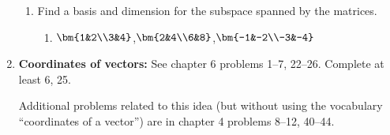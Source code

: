 \begin{enumerate}
\begin{enumerate}

	\item Find a basis and dimension for the subspace spanned by the matrices.
		\begin{enumerate}
			\item $\bm{1&2\\3&4}$,$\bm{2&4\\6&8}$,$\bm{-1&-2\\-3&-4}$
			
		\end{enumerate}

\end{enumerate}

\item \textbf{Coordinates of vectors:}  \label{coordinates problems}
See chapter 6 problems 1--7, 22--26. Complete at least 6, 25. 

Additional problems related to this idea (but without using the vocabulary ``coordinates of a vector'') are in chapter 4 problems 8--12, 40--44.


\end{enumerate}
